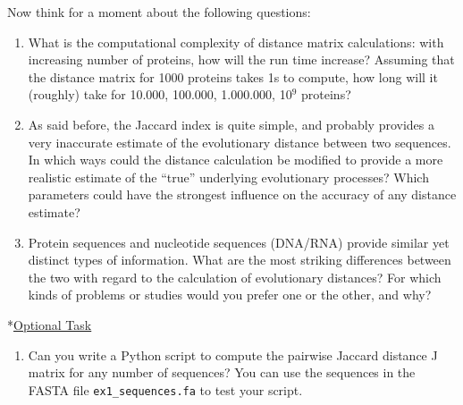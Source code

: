 \documentclass{article}
\begin{document}
\begin{question}[subtitle = Calculating sequence distances from multiple alignments]
    \pagebreak
    Now think for a moment about the following questions:
    \begin{enumerate}
        \item What is the computational complexity of distance matrix calculations: with increasing number of proteins, how will the run time increase? Assuming that the distance matrix for 1000 proteins takes 1s to compute, how long will it (roughly) take for 10.000, 100.000, 1.000.000, 10$^9$ proteins?
        \item As said before, the Jaccard index is quite simple, and probably provides a very inaccurate estimate of the evolutionary distance between two sequences. In which ways could the distance calculation be modified to provide a more realistic estimate of the “true” underlying evolutionary processes? Which parameters could have the strongest influence on the accuracy of any distance estimate?
        \item Protein sequences and nucleotide sequences (DNA/RNA) provide similar yet distinct types of information. What are the most striking differences between the two with regard to the calculation of evolutionary distances? For which kinds of problems or studies would you prefer one or the other, and why?
    \end{enumerate}
    *\underline{Optional Task}
    \begin{enumerate}
        \item Can you write a Python script to compute the pairwise Jaccard distance J matrix for any number of sequences? You can use the sequences in the FASTA file \texttt{ex1\_sequences.fa} to test your script.
    \end{enumerate}
\end{question}
\pagebreak
\end{document}
